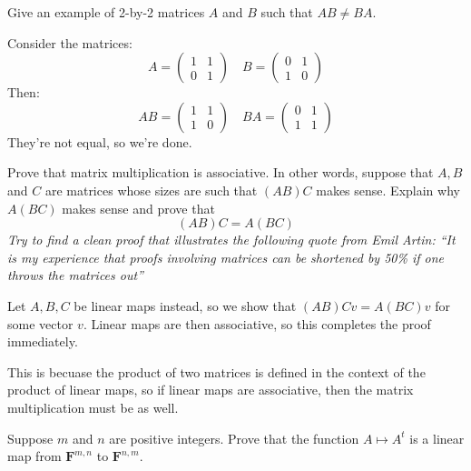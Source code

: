 \documentclass[10pt]{article}
\newcommand{\F}{\mathbf F}
\begin{document}
	\begin{problem}
		Give an example of 2-by-2 matrices \( A \) and \( B \) such that \( AB \neq BA \). 
	\end{problem}

	\begin{solution}
		Consider the matrices:
		\[
			A = \begin{pmatrix} 1 & 1\\0 &1 \end{pmatrix}  \quad B = \begin{pmatrix} 0 & 1 \\ 1 & 0 \end{pmatrix} 
		\] 
		Then:
		\[
			AB = \begin{pmatrix} 1 & 1 \\ 1 & 0 \end{pmatrix} \quad BA = \begin{pmatrix} 0 & 1\\1 & 1 \end{pmatrix} 
		\] 
		They're not equal, so we're done. 
	\end{solution}

	\begin{problem}
		Prove that matrix multiplication is associative. In other words, suppose that \( A, B \) and \( C \) are 
		matrices whose sizes are such that \( (AB)C \) makes sense. Explain why \( A(BC) \) makes sense 
		and prove that 
		\[
			(AB)C = A(BC)
		\] 
		\textit{Try to find a clean proof that illustrates the following quote from Emil Artin: ``It is my 
		experience that proofs involving matrices can be shortened by 50\% if one throws the matrices out''}

		\begin{solution}
			Let \( A, B, C \) be linear maps instead, so we show that \( (AB)Cv = A(BC)v \) for some 
			vector  \( v \). Linear maps are then associative, so this completes the proof immediately. 

			This is becuase the product of two matrices is defined in the context of the product of linear maps, 
			so if linear maps are associative, then the matrix multiplication must be as well.   
		\end{solution}
	\end{problem}

	\begin{problem}
		Suppose \( m \) and \( n \) are positive integers. Prove that the function \( A \mapsto A^{t} \) 
		is a linear map from \( \F^{m, n} \) to \( \F^{n, m} \). 
	\end{problem}
\end{document}
